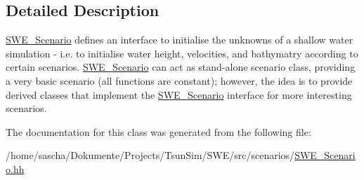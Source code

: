 \subsection{Detailed Description}
\hyperlink{classSWE__Scenario}{S\-W\-E\-\_\-\-Scenario} defines an interface to initialise the unknowns of a shallow water simulation -\/ i.\-e. to initialise water height, velocities, and bathymatry according to certain scenarios. \hyperlink{classSWE__Scenario}{S\-W\-E\-\_\-\-Scenario} can act as stand-\/alone scenario class, providing a very basic scenario (all functions are constant); however, the idea is to provide derived classes that implement the \hyperlink{classSWE__Scenario}{S\-W\-E\-\_\-\-Scenario} interface for more interesting scenarios. 

The documentation for this class was generated from the following file\-:\begin{DoxyCompactItemize}
\item 
/home/sascha/\-Dokumente/\-Projects/\-Tsun\-Sim/\-S\-W\-E/src/scenarios/\hyperlink{SWE__Scenario_8hh}{S\-W\-E\-\_\-\-Scenario.\-hh}\end{DoxyCompactItemize}

